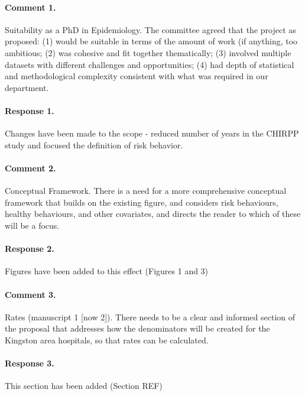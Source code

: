\documentclass [11pt]{article}
\begin{document}
\paragraph{Comment 1.}Suitability as a PhD in Epidemiology.  The committee agreed that the project as proposed: (1) would be suitable in terms of the amount of work (if anything, too ambitious; (2) was cohesive and fit together thematically; (3) involved multiple datasets with different challenges and opportunities; (4) had depth of statistical and methodological complexity consistent with what was required in our department.

\paragraph{Response 1.} Changes have been made to the scope - reduced number of years in the CHIRPP study and focused the definition of risk behavior.

\paragraph{Comment 2.}Conceptual Framework.  There is a need for a more comprehensive conceptual framework that builds on the existing figure, and considers risk behaviours, healthy behaviours, and other covariates, and directs the reader to which of these will be a focus.

\paragraph{Response 2.}Figures have been added to this effect (Figures 1 and 3)
 
\paragraph{Comment 3.}Rates (manuscript 1 [now 2]).  There needs to be a clear and informed section of the proposal that addresses how the denominators will be created for the Kingston area hospitals, so that rates can be calculated.

\paragraph{Response 3.}This section has been added (Section REF)
\end{document}
